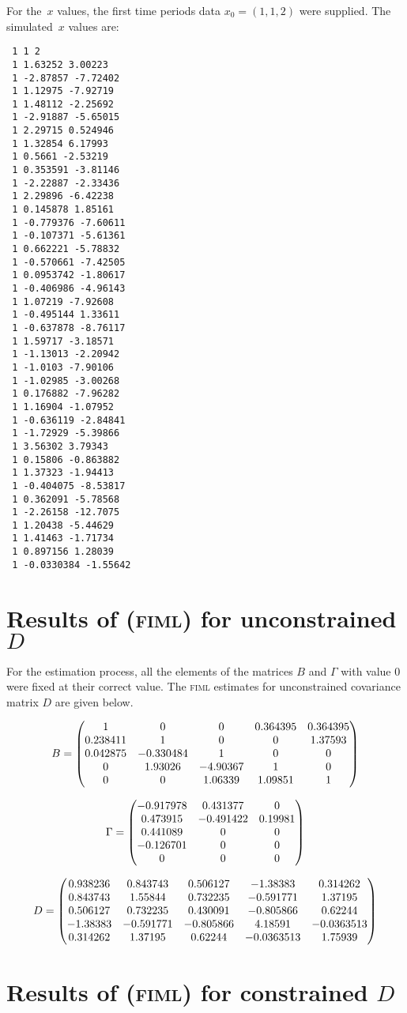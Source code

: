 For the~$x$ values, the first time periods data $x_0 =(1,1,2)$
were supplied.  The simulated~$x$ values are:
\begin{lstlisting}
 1 1 2
 1 1.63252 3.00223
 1 -2.87857 -7.72402
 1 1.12975 -7.92719
 1 1.48112 -2.25692
 1 -2.91887 -5.65015
 1 2.29715 0.524946
 1 1.32854 6.17993
 1 0.5661 -2.53219
 1 0.353591 -3.81146
 1 -2.22887 -2.33436
 1 2.29896 -6.42238
 1 0.145878 1.85161
 1 -0.779376 -7.60611
 1 -0.107371 -5.61361
 1 0.662221 -5.78832
 1 -0.570661 -7.42505
 1 0.0953742 -1.80617
 1 -0.406986 -4.96143
 1 1.07219 -7.92608
 1 -0.495144 1.33611
 1 -0.637878 -8.76117
 1 1.59717 -3.18571
 1 -1.13013 -2.20942
 1 -1.0103 -7.90106
 1 -1.02985 -3.00268
 1 0.176882 -7.96282
 1 1.16904 -1.07952
 1 -0.636119 -2.84841
 1 -1.72929 -5.39866
 1 3.56302 3.79343
 1 0.15806 -0.863882
 1 1.37323 -1.94413
 1 -0.404075 -8.53817
 1 0.362091 -5.78568
 1 -2.26158 -12.7075
 1 1.20438 -5.44629
 1 1.41463 -1.71734
 1 0.897156 1.28039
 1 -0.0330384 -1.55642
\end{lstlisting}


\section{Results of (\textsc{fiml}) for unconstrained $D$} 

For the estimation process, all the elements of the matrices
$B$ and $\Gamma$ with value $0$ were fixed at their correct value.
The \textsc{fiml} estimates for unconstrained covariance matrix $D$ are given
below.

$$B=\begin{pmatrix}
1&0&0&0.364395&0.364395\cr
0.238411&1&0&0&1.37593\cr
0.042875&-0.330484&1&0&0\cr
0&1.93026&-4.90367&1&0\cr
0&0&1.06339&1.09851&1
 \end{pmatrix}
$$

\bigskip
$$\Gamma=\begin{pmatrix}
-0.917978&0.431377&0\cr
0.473915&-0.491422&0.19981\cr
0.441089&0&0\cr
-0.126701&0&0\cr
0&0&0
\end{pmatrix}
$$

\bigskip
$$D=\begin{pmatrix}
0.938236&0.843743&0.506127&-1.38383&0.314262\cr
0.843743&1.55844&0.732235&-0.591771&1.37195\cr
0.506127&0.732235&0.430091&-0.805866&0.62244\cr
-1.38383&-0.591771&-0.805866&4.18591&-0.0363513\cr
0.314262&1.37195&0.62244&-0.0363513&1.75939
\end{pmatrix}
$$


\section{Results of (\textsc{fiml}) for constrained $D$} 

